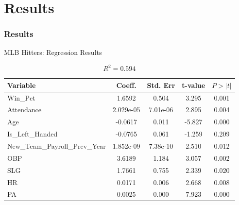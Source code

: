 \documentclass[9pt]{beamer}
\begin{document}
\section{Results}
\begin{frame}
    \frametitle{Results}
    \begin{block}{MLB Hitters: Regression Results}
        \begin{table}[ht]
            \centering
            \caption{\( R^2 = 0.594 \)}
            \begin{tabular}{lcccc}
            \toprule
            Variable & Coeff. & Std. Err & t-value & $P > |t|$ \\
            \midrule
            \rowcolor{red!20} Win\_Pct & 1.6592 & 0.504 & 3.295 & 0.001 \\
            \rowcolor{red!20} Attendance & 2.029e-05 & 7.01e-06 & 2.895 & 0.004 \\
            \rowcolor{red!20} Age & -0.0617 & 0.011 & -5.827 & 0.000 \\
            Is\_Left\_Handed & -0.0765 & 0.061 & -1.259 & 0.209 \\
            \rowcolor{red!20} New\_Team\_Payroll\_Prev\_Year & 1.852e-09 & 7.38e-10 & 2.510 & 0.012 \\
            \rowcolor{red!20} OBP & 3.6189 & 1.184 & 3.057 & 0.002 \\
            \rowcolor{red!20} SLG & 1.7661 & 0.755 & 2.339 & 0.020 \\
            \rowcolor{red!20} HR & 0.0171 & 0.006 & 2.668 & 0.008 \\
            \rowcolor{red!20} PA & 0.0025 & 0.000 & 7.923 & 0.000 \\
            \bottomrule
            \end{tabular}
        \end{table}            
    \end{block}
\end{frame}
\end{document}
